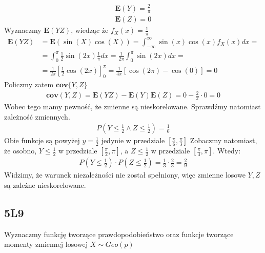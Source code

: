 \documentclass{article}
\numberwithin{equation}{subsection}
\begin{document}
\begin{align}
    \mathbf{E}(Y) = \frac{2}{\pi}\\
    \mathbf{E}(Z) = 0
\end{align}
Wyznaczmy $\mathbf{E}(YZ)$, wiedząc że $f_X(x) = \frac{1}{\pi}$
\begin{align}
    \mathbf{E}(YZ) &= \mathbf{E}(\sin(X) \cos(X)) = \int_{-\infty}^{\infty} \sin(x)\cos(x) f_X(x) dx = \\
    &= \int_{0}^{\pi} \frac{1}{2}\sin(2x) \frac{1}{\pi} dx = \frac{1}{2\pi} \int_{0}^{\pi} \sin(2x) dx = \\
    &= \frac{1}{2\pi} \left[\frac{1}{2} \cos(2x)\right]_{0}^{\pi} = \frac{1}{4\pi} \left[\cos(2\pi) - \cos(0)\right] = 0
\end{align}
Policzmy zatem $\mathbf{cov}\{Y,Z\}$
\begin{align}
    \mathbf{cov}(Y,Z) = \mathbf{E}(YZ) - \mathbf{E}(Y)\mathbf{E}(Z) = 0 - \frac{2}{\pi} \cdot 0 = 0
\end{align}
Wobec tego mamy pewność, że zmienne są nieskorelowane. Sprawdźmy natomiast zależność zmiennych.
\begin{align}
    P(Y\leq \frac{1}{2} \land Z\leq \frac{1}{2}) = \frac{1}{6}
\end{align}
Obie funkcje są powyżej $y=\frac{1}{2}$ jedynie w przedziale $[\frac{\pi}{6},\frac{\pi}{3}]$
Zobaczmy natomiast, że osobno, $Y\leq \frac{1}{2}$ w przedziale $[\frac{\pi}{2},\pi]$, a $Z\leq \frac{1}{2}$ w przedziale $[\frac{\pi}{3},\pi]$. Wtedy:
\begin{align}
    P(Y\leq \frac{1}{2}) \cdot P(Z\leq \frac{1}{2}) = \frac{1}{3} \cdot \frac{2}{3} = \frac{2}{9}
\end{align}
Widzimy, że warunek niezależności nie został spełniony, więc zmienne losowe $Y,Z$ są zależne nieskorelowane.

\subsection{5L9}

Wyznaczmy funkcję tworzące prawdopodobieństwo oraz funkcje tworzące momenty zmiennej losowej $X\sim Geo(p)$
\end{document}
